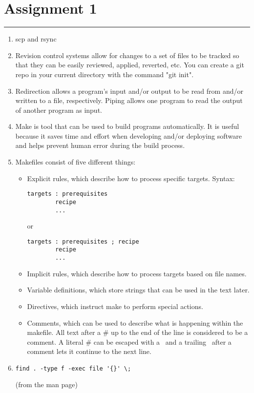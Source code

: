 \documentclass[letterpaper,10pt,fleqn]{article}
\numberwithin{equation}{section}
\begin{document}

\section*{Assignment 1}
\hrule

\begin{enumerate}
\item scp and rsync
\item Revision control systems allow for changes to a set of files to be tracked so that they can be easily reviewed, applied, reverted, etc.  You can create a git repo in your current directory with the command "git init".
\item Redirection allows a program's input and/or output to be read from and/or written to a file, respectively.  Piping allows one program to read the output of another program as input.
\item Make is tool that can be used to build programs automatically.  It is useful because it saves time and effort when developing and/or deploying software and helps prevent human error during the build process.
\item Makefiles consist of five different things:
\begin{itemize}
\item Explicit rules, which describe how to process specific targets.  Syntax:
\begin{verbatim}
targets : prerequisites
        recipe
        ...
\end{verbatim}
or
\begin{verbatim}
targets : prerequisites ; recipe
        recipe
        ...
\end{verbatim}
\item Implicit rules, which describe how to process targets based on file names.
\item Variable definitions, which store strings that can be used in the text later.
\item Directives, which instruct make to perform special actions.
\item Comments, which can be used to describe what is happening within the makefile. All text after a # up to the end of the line is considered to be a comment. A literal # can be escaped with a \, and a trailing \ after a comment lets it continue to the next line.
\end{itemize}
\item \begin{verbatim}find . -type f -exec file '{}' \;\end{verbatim} (from the man page)
\end{enumerate}
\end{document}
